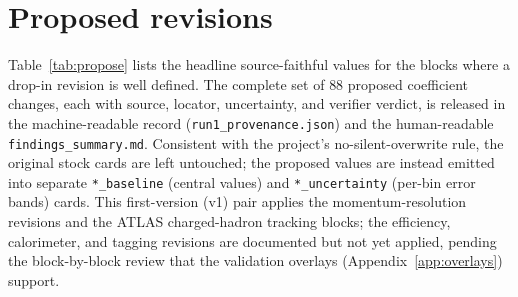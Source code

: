 \documentclass[11pt,a4paper]{article}
\begin{document}
\section{Proposed revisions}
Table~\ref{tab:propose} lists the headline source-faithful values for the blocks
where a drop-in revision is well defined. The complete set of $88$ proposed
coefficient changes, each with source, locator, uncertainty, and verifier
verdict, is released in the machine-readable record
(\texttt{run1\_provenance.json}) and the human-readable
\texttt{findings\_summary.md}. Consistent with the project's no-silent-overwrite
rule, the original stock cards are left untouched; the proposed values are instead
emitted into separate \texttt{*\_baseline} (central values) and
\texttt{*\_uncertainty} (per-bin error bands) cards. This first-version (v1) pair
applies the momentum-resolution revisions and the ATLAS charged-hadron tracking
blocks; the efficiency, calorimeter, and tagging revisions are documented but not
yet applied, pending the block-by-block review that the validation overlays
(Appendix~\ref{app:overlays}) support.
\end{document}
